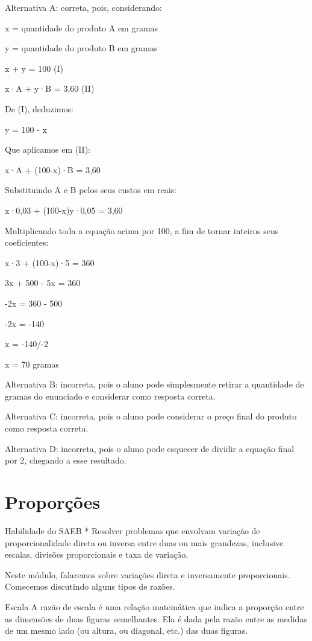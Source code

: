 Alternativa A: correta, pois, considerando:

x = quantidade do produto A em gramas

y = quantidade do produto B em gramas

x + y = 100 (I)

x·A + y·B = 3,60 (II)

De (I), deduzimos:

y = 100 - x

Que aplicamos em (II):

x·A + (100-x)·B = 3,60

Substituindo A e B pelos seus custos em reais:

x·0,03 + (100-x)y·0,05 = 3,60

Multiplicando toda a equação acima por 100, a fim de tornar inteiros
seus coeficientes:

x·3 + (100-x)·5 = 360

3x + 500 - 5x = 360

-2x = 360 - 500

-2x = -140

x = -140/-2

x = 70 gramas

Alternativa B: incorreta, pois o aluno pode simplesmente retirar a
quantidade de gramas do enunciado e considerar como resposta correta.

Alternativa C: incorreta, pois o aluno pode considerar o preço final do
produto como resposta correta.

Alternativa D: incorreta, pois o aluno pode esquecer de dividir a
equação final por 2, chegando a esse resultado.

\chapter{Proporções}

Habilidade do SAEB * Resolver problemas que envolvam variação de
proporcionalidade direta ou inversa entre duas ou mais grandezas,
inclusive escalas, divisões proporcionais e taxa de variação.

Neste módulo, falaremos sobre variações direta e inversamente
proporcionais. Comecemos discutindo alguns tipos de razões.

Escala A razão de escala é uma relação matemática que indica a proporção
entre as dimensões de duas figuras semelhantes. Ela é dada pela razão
entre as medidas de um mesmo lado (ou altura, ou diagonal, etc.) das
duas figuras.

